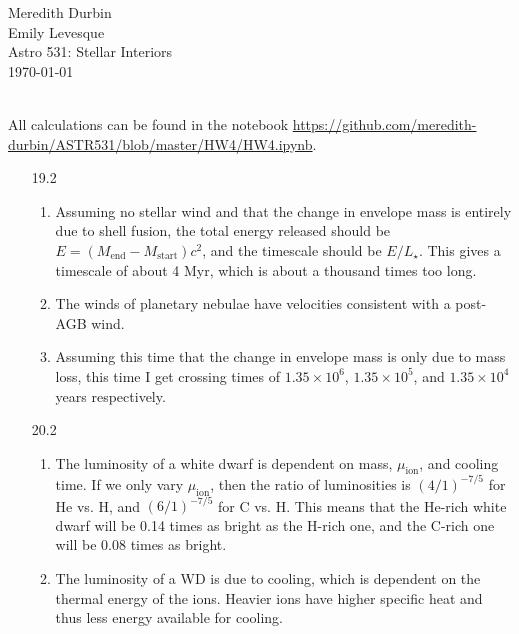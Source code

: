 \documentclass[11pt]{article}
\begin{document}
\begin{flushright}Meredith Durbin\\
Emily Levesque\\
Astro 531: Stellar Interiors\\
\today\\

\end{flushright}

 \\[6pt]

All calculations can be found in the notebook \url{https://github.com/meredith-durbin/ASTR531/blob/master/HW4/HW4.ipynb}.

\begin{enumerate}

\item [19.2]
	\begin{enumerate}
	
    \item Assuming no stellar wind and that the change in envelope mass is entirely due to shell fusion, the total energy released should be $E = (M_\mathrm{end}-M_\mathrm{start})c^2$, and the timescale should be $E/L_\star$. This gives a timescale of about 4 Myr, which is about a thousand times too long.
    
    \item The winds of planetary nebulae have velocities consistent with a post-AGB wind.
    
    \item Assuming this time that the change in envelope mass is only due to mass loss, this time I get crossing times of $1.35\times10^6$, $1.35\times10^5$, and $1.35\times10^4$ years respectively.
    
    \end{enumerate}

\item [20.2] 
	\begin{enumerate}
	
    \item The luminosity of a white dwarf is dependent on mass, $\mu_\mathrm{ion}$, and cooling time. If we only vary $\mu_\mathrm{ion}$, then the ratio of luminosities is $(4/1)^{-7/5}$ for He vs. H, and $(6/1)^{-7/5}$ for C vs. H. This means that the He-rich white dwarf will be 0.14 times as bright as the H-rich one, and the C-rich one will be 0.08 times as bright.
    
    \item The luminosity of a WD is due to cooling, which is dependent on the thermal energy of the ions. Heavier ions have higher specific heat and thus less energy available for cooling.
        

\end{enumerate}
\end{enumerate}
\end{document}

